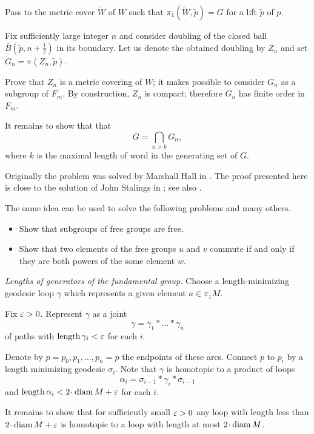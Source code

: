 Pass to the metric cover $\tilde W$ of $W$ 
such that  $\pi_1(\tilde W,\tilde p)=G$ 
for a lift $\tilde p$ of $p$.

Fix sufficiently large integer $n$ and consider doubling of the closed ball $\bar B(\tilde p,n+\frac12)$ in its boundary.
Let us denote the obtained doubling by $Z_n$ and set $G_n=\pi(Z_n,\tilde p)$.

Prove that $Z_n$ is a metric covering of $W$;
it makes possible to consider $G_n$ as a subgroup of $F_m$.
By construction, $Z_n$ is compact;
therefore $G_n$ has finite order in $F_m$.


It remains to show that that 
\[G=\bigcap_{n>k} G_n,\]
where $k$ is the maximal length of word in the generating set of $G$.

 
Originally the problem was solved by Marshall Hall in \cite{hall}.
The proof presented here is close to the solution of John Stalings in \cite{stallings};
see also \cite{wilton}.

The same idea can be used to solve the following problems and many others.
\begin{itemize}
\item Show that subgroups of free groups are free.
\item Show that two elements of the free groups $u$ and $v$ commute 
if and only if they are both powers of
the some element $w$.
\end{itemize}



\textit{Lengths of generators of the fundamental group.}
Choose a length-minimizing geodesic loop $\gamma$ 
which represents a given element $a\in\pi_1M$.

Fix $\varepsilon>0$.
Represent $\gamma$ 
as a joint 
\[\gamma=\gamma_1{*}\dots{*}\gamma_n\]
of paths with $\operatorname{\rm length}\gamma_i<\varepsilon$ for each $i$.
 
Denote by $p=p_0,p_1,\dots, p_n=p$ the endpoints of these arcs.
Connect $p$ to $p_i$ by a length minimizing geodesic $\sigma_i$.
Note that $\gamma$ is homotopic to a product of loops
\[\alpha_i=\sigma_{i-1}{*}\gamma_i{*}\sigma_{i-1}\]
and $\length \alpha_i<2\cdot\diam M+\eps$ for each $i$.

It remains to show that for sufficiently small $\varepsilon>0$
any loop with length less than $2\cdot\diam M+\eps$ 
is homotopic to a loop with length at most $2\cdot\diam M$.

